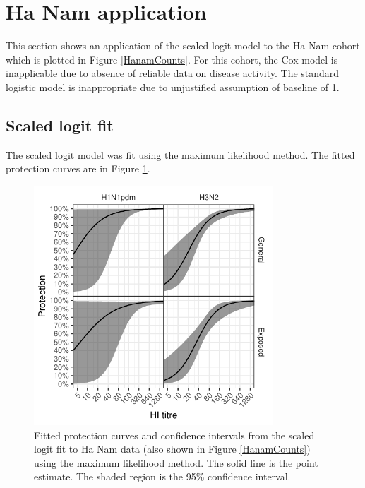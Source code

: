 \documentclass[12pt]{article}
\begin{document}
\section{Ha Nam application}

This section shows an application of the scaled logit model to the Ha Nam cohort which is plotted in Figure \ref{HanamCounts}. For this cohort, the Cox model is inapplicable due to absence of reliable data on disease activity. The standard logistic model is inappropriate due to unjustified assumption of baseline of 1.

\subsection{Scaled logit fit}

The scaled logit model was fit using the maximum likelihood method. The fitted protection curves are in Figure \ref{fig:fit-sclr-prot}.

\begin{figure}[htp]
	\centering
	\includegraphics[width=0.8\textwidth]{../fit-sclr-plot/hanam-hi-prot.pdf}
	\caption{
	Fitted protection curves and confidence intervals from the scaled logit fit to Ha Nam data (also shown in Figure \ref{HanamCounts}) using the maximum likelihood method. The solid line is the point estimate. The shaded region is the 95\% confidence interval.
	}
	\label{fig:fit-sclr-prot}
\end{figure}
\end{document}
